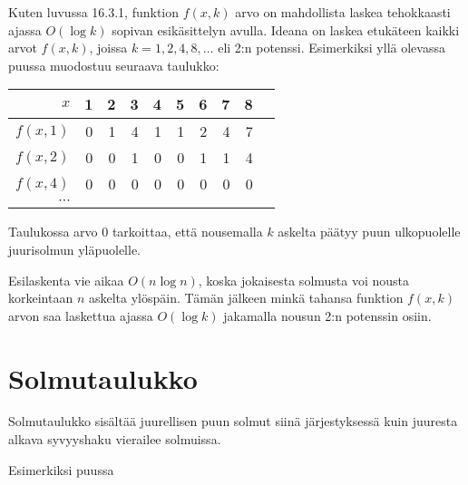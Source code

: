 Kuten luvussa 16.3.1, funktion $f(x,k)$
arvo on mahdollista laskea tehokkaasti ajassa
$O(\log k)$ sopivan esikäsittelyn avulla.
Ideana on laskea etukäteen kaikki arvot
$f(x,k)$, joissa $k=1,2,4,8,\ldots$ eli 2:n potenssi.
Esimerkiksi yllä olevassa puussa muodostuu seuraava taulukko:

\begin{center}
\begin{tabular}{r|rrrrrrrrr}
$x$ & 1 & 2 & 3 & 4 & 5 & 6 & 7 & 8 \\
\hline
$f(x,1)$ & 0 & 1 & 4 & 1 & 1 & 2 & 4 & 7 \\
$f(x,2)$ & 0 & 0 & 1 & 0 & 0 & 1 & 1 & 4 \\
$f(x,4)$ & 0 & 0 & 0 & 0 & 0 & 0 & 0 & 0 \\
$\cdots$ \\
\end{tabular}
\end{center}

Taulukossa arvo 0 tarkoittaa, että nousemalla $k$
askelta päätyy puun ulkopuolelle juurisolmun yläpuolelle.

Esilaskenta vie aikaa $O(n \log n)$, koska jokaisesta
solmusta voi nousta korkeintaan $n$ askelta ylöspäin.
Tämän jälkeen minkä tahansa funktion $f(x,k)$ arvon saa
laskettua ajassa $O(\log k)$ jakamalla nousun 2:n
potenssin osiin.

\section{Solmutaulukko}

Solmutaulukko sisältää juurellisen puun solmut siinä
järjestyksessä kuin juuresta alkava syvyyshaku
vierailee solmuissa.

Esimerkiksi puussa
\begin{center}
\end{center}

